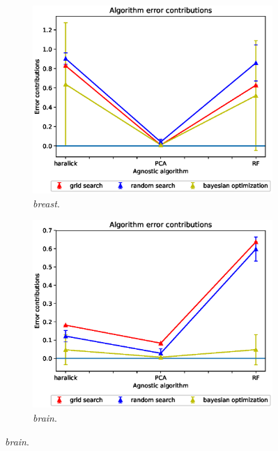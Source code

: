 \begin{figure}[ht!]
\centering
\begin{subfigure}{.5\textwidth}
  \centering
  \includegraphics[scale=0.37]{img/EP/agnostic_error_alg_breast.eps}
  \caption{\textit{breast}.}
  \label{fig:eq_alg_breast}
\end{subfigure}%
\begin{subfigure}{.5\textwidth}
  \centering
  \includegraphics[scale=0.37]{img/EP/agnostic_error_alg_brain.eps}
  \caption{\textit{brain}.}
  \label{fig:eq_alg_brain}

\end{subfigure}
\end{figure}
